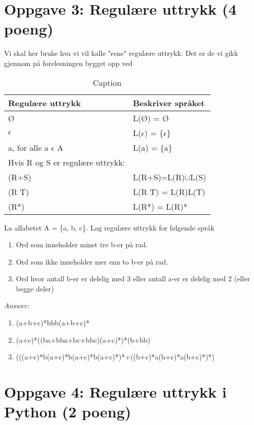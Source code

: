 \documentclass[a4paper, 12pt,]{article}             %
\begin{document}
\section*{Oppgave 3: Regulære uttrykk (4 poeng)}
  Vi skal her bruke hva vi vil kalle "rene" regulære uttrykk.  Det er de vi gikk gjennom på forelesningen 
bygget opp ved 
\begin{table}[H]
\centering
  \begin{tabular}{l l}
    Regulære uttrykk           & Beskriver språket           \\ \hline
    Ø                          & L(Ø) = Ø                    \\ 
    $\epsilon$                   & L($\epsilon$) = \{$\epsilon$\}  \\ 
    a, for alle a $\epsilon$ A   & L(a) = \{a\}                \\
    Hvis R og S er regulære uttrykk: & \\ \hline
    (R+S) & L(R+S)=L(R)$\cup$L(S) \\
    (R T) & L(R T) = L(R)L(T) \\
    (R*) & L(R*) = L(R)* \\
  \end{tabular}
  \caption{Caption}
  \label{tab:my_label}
\end{table}

La alfabetet A = \{a, b, c\}. Lag regulære uttrykk for følgende språk
\begin{enumerate}
  \item Ord som inneholder minst tre b-er på rad.
  \item Ord som ikke inneholder mer enn to b-er på rad.
  \item Ord hvor antall b-er er delelig med 3 eller antall a-er er delelig med 2 (eller begge deler)
\end{enumerate}

\textit{Answer:}

\begin{enumerate}
  \item (a+b+c)*bbb(a+b+c)*
  \item (a+c)*((ba+bba+bc+bbc)(a+c)*)*(b+bb)
  \item (((a+c)*b(a+c)*b(a+c)*b(a+c)*)*+((b+c)*a(b+c)*a(b+c)*)*)
\end{enumerate}

\section*{Oppgave 4: Regulære uttrykk i Python (2 poeng)}
\end{document}
